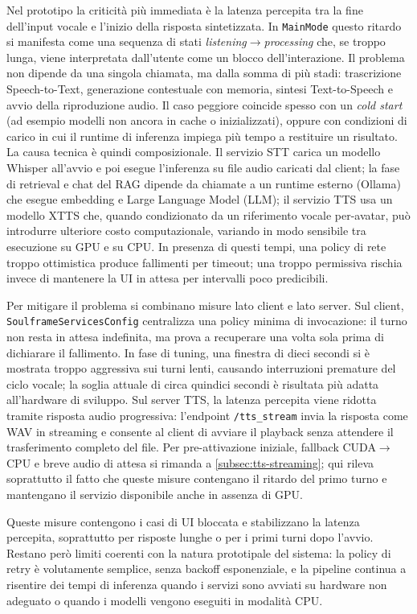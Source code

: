 Nel prototipo la criticità più immediata è la latenza percepita tra la fine dell'input vocale e l'inizio della risposta sintetizzata. In \texttt{MainMode} questo ritardo si manifesta come una sequenza di stati \emph{listening}$\rightarrow$\emph{processing} che, se troppo lunga, viene interpretata dall'utente come un blocco dell'interazione. Il problema non dipende da una singola chiamata, ma dalla somma di più stadi: trascrizione Speech-to-Text, generazione contestuale con memoria, sintesi Text-to-Speech e avvio della riproduzione audio. Il caso peggiore coincide spesso con un \emph{cold start} (ad esempio modelli non ancora in cache o inizializzati), oppure con condizioni di carico in cui il runtime di inferenza impiega più tempo a restituire un risultato. La causa tecnica è quindi composizionale. Il servizio STT carica un modello Whisper all'avvio e poi esegue l'inferenza su file audio caricati dal client; la fase di retrieval e chat del RAG dipende da chiamate a un runtime esterno (Ollama) che esegue embedding e Large Language Model (LLM); il servizio TTS usa un modello XTTS che, quando condizionato da un riferimento vocale per-avatar, può introdurre ulteriore costo computazionale, variando in modo sensibile tra esecuzione su GPU e su CPU. In presenza di questi tempi, una policy di rete troppo ottimistica produce fallimenti per timeout; una troppo permissiva rischia invece di mantenere la UI in attesa per intervalli poco predicibili.

Per mitigare il problema si combinano misure lato client e lato server. Sul client, \texttt{SoulframeServicesConfig} centralizza una policy minima di invocazione: il turno non resta in attesa indefinita, ma prova a recuperare una volta sola prima di dichiarare il fallimento. In fase di tuning, una finestra di dieci secondi si è mostrata troppo aggressiva sui turni lenti, causando interruzioni premature del ciclo vocale; la soglia attuale di circa quindici secondi è risultata più adatta all'hardware di sviluppo. Sul server TTS, la latenza percepita viene ridotta tramite risposta audio progressiva: l'endpoint \texttt{/tts_stream} invia la risposta come WAV in streaming e consente al client di avviare il playback senza attendere il trasferimento completo del file. Per pre-attivazione iniziale, fallback CUDA$\rightarrow$CPU e breve audio di attesa si rimanda a \autoref{subsec:tts-streaming}; qui rileva soprattutto il fatto che queste misure contengano il ritardo del primo turno e mantengano il servizio disponibile anche in assenza di GPU.

Queste misure contengono i casi di UI bloccata e stabilizzano la latenza percepita, soprattutto per risposte lunghe o per i primi turni dopo l'avvio. Restano però limiti coerenti con la natura prototipale del sistema: la policy di retry è volutamente semplice, senza backoff esponenziale, e la pipeline continua a risentire dei tempi di inferenza quando i servizi sono avviati su hardware non adeguato o quando i modelli vengono eseguiti in modalità CPU.

